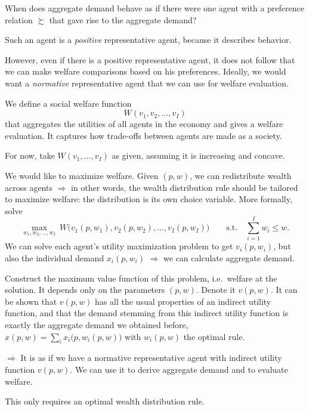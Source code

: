\documentclass[11pt]{article}
\begin{document}
When does aggregate demand behave as if there were one agent with a preference
relation $\succsim$ that gave rise to the aggregate demand?

Such an agent is a \emph{positive} representative agent, because it describes
behavior.

However, even if there is a positive representative agent, it does not follow that
we can make welfare comparisons based on his preferences. Ideally, we would want a
\emph{normative} representative agent that we can use for welfare evaluation.

We define a social welfare function
\[ W(v_1,v_2,\dots,v_I) \]
that aggregates the utilities of all agents in the economy and gives a welfare
evaluation. It captures how trade-offs between agents are made as a society.

For now, take $W(v_1,\dots,v_I)$ as given, assuming it is increasing and concave.

We would like to maximize welfare. Given $(p,w)$, we can redistribute wealth across
agents $\Rightarrow$ in other words, the wealth distribution rule should be tailored
to maximize welfare: the distribution is its own choice variable. More formally,
solve
\[ \max_{w_1,w_2,\dots,w_I}\ W\bigl(v_1(p,w_1),v_2(p,w_2),\dots,v_I(p,w_I)\bigr)
   \qquad\text{s.t.}\quad \sum_{i=1}^{I}w_i\le w. \]
We can solve each agent's utility maximization problem to get $v_i(p,w_i)$, but
also the individual demand $x_i(p,w_i)$ $\Rightarrow$ we can calculate aggregate
demand.

Construct the maximum value function of this problem, i.e.\ welfare at the solution.
It depends only on the parameters $(p,w)$. Denote it $v(p,w)$. It can be shown that
$v(p,w)$ has all the usual properties of an indirect utility function, and that the
demand stemming from this indirect utility function is exactly the aggregate demand
we obtained before, $x(p,w)=\sum_i x_i\bigl(p,w_i(p,w)\bigr)$ with $w_i(p,w)$ the
optimal rule.

$\Rightarrow$ It is as if we have a normative representative agent with indirect
utility function $v(p,w)$. We can use it to derive aggregate demand and to evaluate
welfare.

This only requires an optimal wealth distribution rule.
\end{document}
